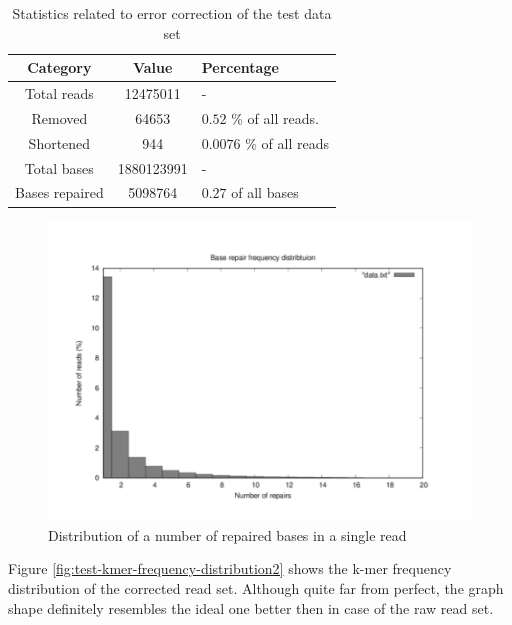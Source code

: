 \begin{table}[h]
\begin{center}
\caption{Statistics related to error correction of the test data set}
\label{tab:test-correction}
\begin{tabular}{| c | c | p{5cm} |}
\hline
Category & Value & Percentage \\
\hline
Total reads & 12475011 & - \\
\hline
Removed & 64653 &  $0.52$ \% of all reads. \\
\hline
Shortened & 944 & $0.0076$ \% of all reads \\
\hline
Total bases & 1880123991 & - \\
\hline
Bases repaired & 5098764 &  $0.27$ of all bases \\
\hline
\end{tabular}
\end{center}
\end{table}

\begin{figure}[h]
	\centering
	\includegraphics{img/test-repair-frequency.pdf}
	\caption{Distribution of a number of repaired bases in a single read}
	\label{fig:test-repair-frequency}
\end{figure}

Figure \ref{fig:test-kmer-frequency-distribution2} shows the k-mer frequency distribution of the corrected read set. Although quite far from perfect, the graph shape definitely resembles the ideal one better then in case of the raw  read set. 


